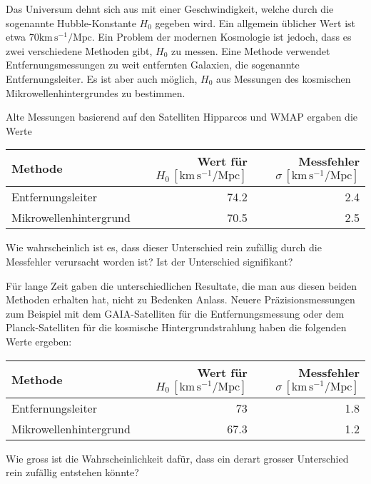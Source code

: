 Das Universum dehnt sich aus mit einer Geschwindigkeit, welche
durch die sogenannte Hubble-Konstante $H_0$ gegeben wird.
Ein allgemein üblicher Wert ist etwa $70 \text{km}\,\text{s}^{-1}/\text{Mpc}$.
Ein Problem der modernen Kosmologie ist jedoch, dass es zwei verschiedene
Methoden gibt, $H_0$ zu messen.
Eine Methode verwendet Entfernungsmessungen zu weit entfernten Galaxien,
die sogenannte Entfernungsleiter.
Es ist aber auch möglich, $H_0$ aus Messungen des kosmischen
Mikrowellenhintergrundes zu bestimmen.
\begin{teilaufgaben}
\item
Alte Messungen basierend auf den Satelliten Hipparcos und WMAP ergaben
die Werte
\begin{center}
\begin{tabular}{|l|r|r|}
\hline
Methode               &Wert für $H_0\,[\text{km}\,\text{s}^{-1}/\text{Mpc}]$&Messfehler $\sigma\,[\text{km}\,\text{s}^{-1}/\text{Mpc}]$\\
\hline
Entfernungsleiter     &74.2&2.4\\
Mikrowellenhintergrund&70.5&2.5\\
\hline
\end{tabular}
\end{center}
Wie wahrscheinlich ist es, dass dieser Unterschied rein zufällig durch
die Messfehler verursacht worden ist?
Ist der Unterschied signifikant?
\item
Für lange Zeit gaben die unterschiedlichen Resultate, die man aus diesen
beiden Methoden erhalten hat, nicht zu Bedenken Anlass.
Neuere Präzisionsmessungen zum Beispiel mit dem GAIA-Satelliten für 
die Entfernungsmessung oder dem Planck-Satelliten für die kosmische
Hintergrundstrahlung haben die folgenden Werte ergeben:
\begin{center}
\begin{tabular}{|l|r|r|}
\hline
Methode               &Wert für $H_0\,[\text{km}\,\text{s}^{-1}/\text{Mpc}]$&Messfehler $\sigma\,[\text{km}\,\text{s}^{-1}/\text{Mpc}]$\\
\hline
Entfernungsleiter     &73\phantom{.0}&1.8\\
Mikrowellenhintergrund&67.3&1.2\\
\hline
\end{tabular}
\end{center}
Wie gross ist die Wahrscheinlichkeit dafür, dass ein derart grosser
Unterschied rein zufällig entstehen könnte?
\end{teilaufgaben}

